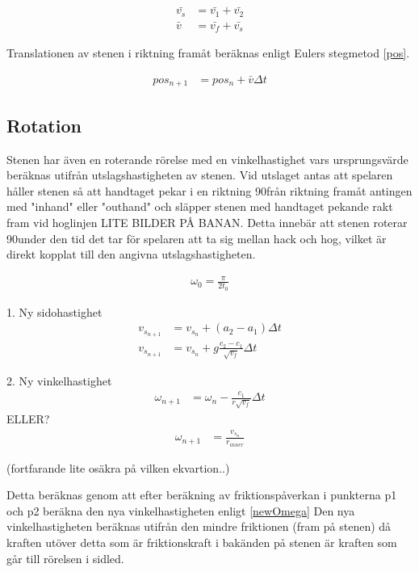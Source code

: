 \documentclass[11pt]{article} %
\begin{document}
 \begin{align}\label{vtot}
 \bar{v_s}& = \bar{v_1}+\bar{v_2}\\
 \bar{v}&=\bar{v_f}+\bar{v_s}
 \end{align}

Translationen av stenen i riktning framåt beräknas enligt Eulers stegmetod \eqref{pos}. 

 \begin{align}\label{pos}
 pos_{n+1}& = pos_{n} + \bar{v} \Delta t
 \end{align}

\subsection{Rotation}


Stenen har även en roterande rörelse med en vinkelhastighet vars ursprungsvärde beräknas utifrån utslagshastigheten av stenen.
Vid utslaget antas att spelaren håller stenen så att handtaget pekar i en riktning 90\textdegree  från riktning framåt antingen med "inhand" eller "outhand" och släpper stenen med handtaget pekande rakt fram vid hoglinjen LITE BILDER PÅ BANAN. Detta innebär att stenen roterar 90\textdegree under den tid det tar för spelaren att ta sig mellan hack och hog, vilket är direkt kopplat till den angivna utslagshastigheten. 

\begin{align}%
 \omega_0 = \frac{\pi}{2 t_0} 
 \end{align}

1. Ny sidohastighet
 \begin{align}\label{vNew}
v_{s_{n+1}}& = v_{s_{n}} + (a_2-a_1) \Delta t\\
v_{s_{n+1}}& = v_{s_{n}} + g \frac{c_2-c_1}{\sqrt{v_f}} \Delta t
 \end{align}

2. Ny vinkelhastighet
 \begin{align}\label{omegaNew}
\omega_{n+1}& = \omega_n - \frac{c_1}{r \sqrt{v_f}} \Delta t
 \end{align}
ELLER? 
 \begin{align}\label{omegaN}
\omega_{n+1}& = \frac{v_{s_n}} {r_{inner}}
 \end{align}

(fortfarande lite osäkra på vilken ekvartion..)

 Detta beräknas genom att efter beräkning av friktionspåverkan i punkterna p1 och p2 beräkna den nya vinkelhastigheten enligt \eqref{newOmega}
Den nya vinkelhastigheten beräknas utifrån den mindre friktionen (fram på stenen) då kraften utöver detta som är friktionskraft i bakänden på stenen är kraften som går till rörelsen i sidled. 
 
\end{document}
